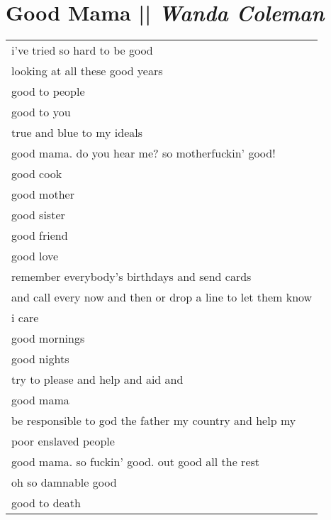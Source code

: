 \section[Good Mama]{Good Mama || \emph{Wanda Coleman} \hspace*{\fill}  \thepage}
\vfill
\hspace{0pt}
\begin{center}
\begin{tabular}{l}
i've tried so hard to be good\\
looking at all these good years\\
good to people\\
good to you\\
true and blue to my ideals\\
good mama. do you hear me? so motherfuckin' good!\\
good cook\\
good mother\\
good sister\\
good friend\\
good love\\
remember everybody's birthdays and send cards\\
and call every now and then or drop a line to let them know\\
i care\\
good mornings\\
good nights\\
try to please and help and aid and\\
good mama\\
be responsible to god the father my country and help my\\
poor enslaved people\\
good mama. so fuckin' good. out good all the rest\\
oh so damnable good\\
good to death
\end{tabular}
\end{center}
\hspace{0pt}
\vfill
